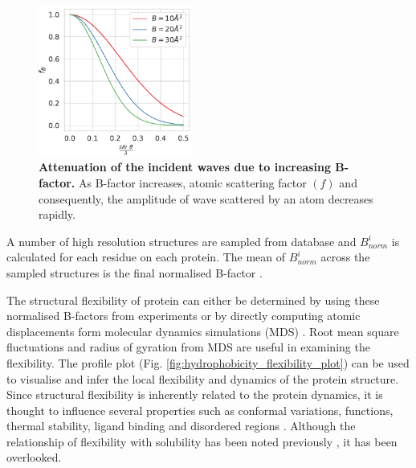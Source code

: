 \begin{figure}
  \begin{center}
    \includegraphics[width=0.45\textwidth]{chapters/Introduction/Figures/bfactors.pdf}
    \caption[Attenuation of the incident waves due to increasing B-factor.]{\textbf{Attenuation of the incident waves due to increasing B-factor.} As B-factor increases, atomic scattering factor $(f)$ and consequently, the amplitude of wave scattered by an atom decreases rapidly.}%
    \label{fig:bfactors}
  \end{center}
\end{figure}


A number of high resolution structures are sampled from database and $B_{norm}^i$ is calculated for each residue on each protein. The mean of $B_{norm}^i$ across the sampled structures is the final normalised B-factor \cite{Schlessinger2005-ps, Smith2003-gb, Karplus1985-ea, vihinen1994accuracy}. 


The structural flexibility of protein can either be determined by using these normalised B-factors from experiments or by directly computing atomic displacements form molecular dynamics simulations (MDS) 
\cite{dong2018structural, kufareva2011methods}. Root mean square fluctuations and radius of gyration from MDS are useful in examining the flexibility. The profile plot (Fig. \ref{fig:hydrophobicity_flexibility_plot}) can be used to visualise and infer the local flexibility and dynamics of the protein structure. Since structural flexibility is inherently related to the protein dynamics, it is thought to influence several properties such as conformal variations, functions, thermal stability, ligand binding and disordered regions  \cite{Vihinen1987-jo, Teague2003-vq, Ma2005-cr, Yuan2005-gl, Yin2011-su, amaral2017protein}. Although the relationship of flexibility with solubility has been noted previously \cite{Tsumoto2003-qp}, it has been overlooked. 


